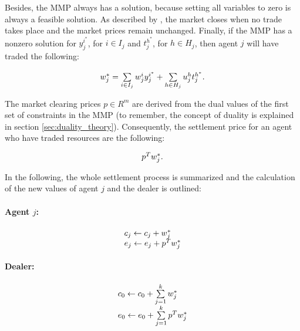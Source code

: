 Besides, the MMP always has a solution, because setting all variables to zero 
is always a feasible solution. As described by , the market closes when no trade takes place 
and the market prices remain unchanged. Finally, if the MMP has a nonzero solution for
 $y_{j}^{i^{*}}$, for $i \in I_{j}$ and $t_{j}^{h^{*}}$, for $h \in H_{j}$, then agent $j$ will have traded the following:

 \begin{equation*}
 \begin{array}{ll@{}ll}
 w_{j}^{*} = 
 \sum\limits_{i \in I_{j}}^{} w_{j}^{i}y_{j}^{i^{*}} + 
 \sum\limits_{h \in H_{j}}^{} u_{j}^{h}t_{j}^{h^{*}}.
 \end{array}
\end{equation*}

The market clearing prices $p \in R^{m}$ are derived from the dual values of the first set of constraints in the MMP
(to remember, the concept of duality is explained in section \ref{sec:duality_theory}).
Consequently, the settlement price for an agent who have traded resources are the following:

\begin{equation*}
 \begin{array}{ll@{}ll}
 p^{T} w_{j}^{*}.
 \end{array}
\end{equation*}

In the following, the whole settlement process is summarized and the calculation of the new values of agent $j$ and the dealer 
is outlined:

\paragraph*{Agent $j$:}
\begin{equation*}
 \begin{array}{ll@{}ll}
 c_{j} \leftarrow c_{j} + w_{j}^{*} \\
 e_{j} \leftarrow e_{j} + p^{T} w_{j}^{*} \\
 \end{array}
\end{equation*}

\paragraph*{Dealer:}
\begin{equation*}
 \begin{array}{ll@{}ll}
 c_{0} \leftarrow c_{0} + \sum\limits_{j=1}^{k} w_{j}^{*} \\
 e_{0} \leftarrow e_{0} + \sum\limits_{j=1}^{k} p^{T} w_{j}^{*} \\
 \end{array}
\end{equation*}

